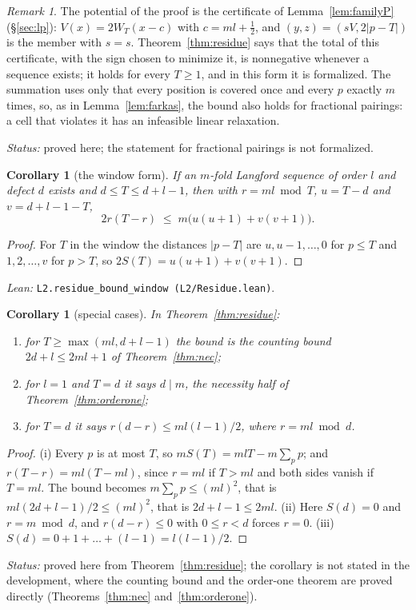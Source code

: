\documentclass[11pt]{amsart}
\theoremstyle{plain}
\newtheorem{corollary}[theorem]{Corollary}
\theoremstyle{definition}
\theoremstyle{remark}
\newtheorem{remark}[theorem]{Remark}
\newcommand{\lean}[1]{\par\smallskip
  {\small\raggedright\noindent\textit{Lean:} \texttt{#1}.\par}\smallskip}
\newcommand{\status}[1]{\par\smallskip
  {\small\raggedright\noindent\textit{Status:} #1\par}\smallskip}
\begin{document}
\begin{remark}\label{rem:residuecert}
The potential of the proof is the certificate of Lemma~\ref{lem:familyP}
(\S\ref{sec:lp}): $V(x) = 2W_T(x - c)$ with $c = ml + \tfrac12$, and $(y,z) =
(s V, 2|p - T|)$ is the member with $s = s$. Theorem~\ref{thm:residue} says
that the total of this certificate, with the sign chosen to minimize it, is nonnegative
whenever a sequence exists; it holds for every $T \ge 1$, and in this form it is
formalized. The summation uses only that every position is covered once and every $p$
exactly $m$ times, so, as in Lemma~\ref{lem:farkas}, the bound also holds for fractional
pairings: a cell that violates it has an infeasible linear relaxation.
\end{remark}
\status{proved here; the statement for fractional pairings is not formalized.}

\begin{corollary}[the window form]\label{cor:window}
If an $m$-fold Langford sequence of order $l$ and defect $d$ exists and
$d \le T \le d+l-1$, then with $r = ml \bmod T$, $u = T - d$ and $v = d + l - 1 - T$,
\[
  2r(T-r) \;\le\; m\bigl(u(u+1) + v(v+1)\bigr).
\]
\end{corollary}

\begin{proof}
For $T$ in the window the distances $|p - T|$ are $u, u-1, \dots, 0$ for $p \le T$ and
$1, 2, \dots, v$ for $p > T$, so $2S(T) = u(u+1) + v(v+1)$.
\end{proof}
\lean{L2.residue\_bound\_window (L2/Residue.lean)}

\begin{corollary}[special cases]\label{cor:residuecases}
In Theorem~\ref{thm:residue}:
\begin{enumerate}
\item for $T \ge \max(ml, d+l-1)$ the bound is the counting bound $2d + l \le 2ml + 1$
  of Theorem~\ref{thm:nec};
\item for $l = 1$ and $T = d$ it says $d \mid m$, the necessity half of
  Theorem~\ref{thm:orderone};
\item for $T = d$ it says $r(d-r) \le ml(l-1)/2$, where $r = ml \bmod d$.
\end{enumerate}
\end{corollary}

\begin{proof}
(i) Every $p$ is at most $T$, so $mS(T) = mlT - m\sum_p p$; and $r(T-r) = ml(T - ml)$,
since $r = ml$ if $T > ml$ and both sides vanish if $T = ml$. The bound becomes
$m\sum_p p \le (ml)^2$, that is $ml(2d+l-1)/2 \le (ml)^2$, that is $2d + l - 1 \le 2ml$.
(ii) Here $S(d) = 0$ and $r = m \bmod d$, and $r(d-r) \le 0$ with $0 \le r < d$ forces
$r = 0$. (iii) $S(d) = 0 + 1 + \dots + (l-1) = l(l-1)/2$.
\end{proof}
\status{proved here from Theorem~\ref{thm:residue}; the corollary is not stated in the
development, where the counting bound and the order-one theorem are proved directly
(Theorems~\ref{thm:nec} and~\ref{thm:orderone}).}
\end{document}
